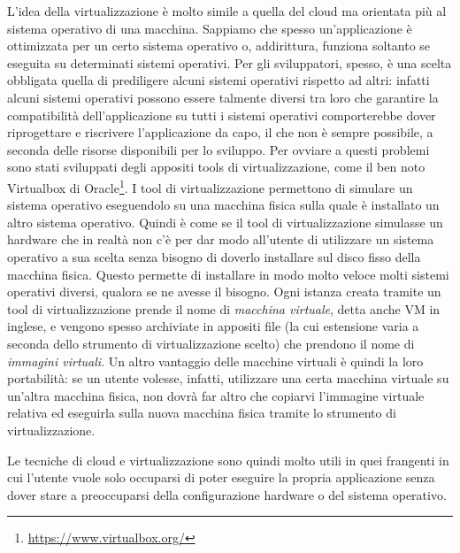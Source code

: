     L'idea della virtualizzazione è molto simile a quella del cloud ma orientata più al sistema operativo di una macchina. Sappiamo che spesso un'applicazione è ottimizzata per un certo sistema operativo o, addirittura, funziona soltanto se eseguita su determinati sistemi operativi. Per gli sviluppatori, spesso, è una scelta obbligata quella di prediligere alcuni sistemi operativi rispetto ad altri: infatti alcuni sistemi operativi possono essere talmente diversi tra loro che garantire la compatibilità dell'applicazione su tutti i sistemi operativi comporterebbe dover riprogettare e riscrivere l'applicazione da capo, il che non è sempre possibile, a seconda delle risorse disponibili per lo sviluppo. Per ovviare a questi problemi sono stati sviluppati degli appositi tools di virtualizzazione, come il ben noto Virtualbox di Oracle\footnote{\url{https://www.virtualbox.org/}}. I tool di virtualizzazione permettono di simulare un sistema operativo eseguendolo su una macchina fisica sulla quale è installato un altro sistema operativo. Quindi è come se il tool di virtualizzazione simulasse un hardware che in realtà non c'è per dar modo all'utente di utilizzare un sistema operativo a sua scelta senza bisogno di doverlo installare sul disco fisso della macchina fisica. Questo permette di installare in modo molto veloce molti sistemi operativi diversi, qualora se ne avesse il bisogno. Ogni istanza creata tramite un tool di virtualizzazione prende il nome di \textit{macchina virtuale}, detta anche \ac{VM} in inglese, e vengono spesso archiviate in appositi file (la cui estensione varia a seconda dello strumento di virtualizzazione scelto) che prendono il nome di \textit{immagini virtuali}. Un altro vantaggio delle macchine virtuali è quindi la loro portabilità: se un utente volesse, infatti, utilizzare una certa macchina virtuale su un'altra macchina fisica, non dovrà far altro che copiarvi l'immagine virtuale relativa ed eseguirla sulla nuova macchina fisica tramite lo strumento di virtualizzazione.
    
    Le tecniche di cloud e virtualizzazione sono quindi molto utili in quei frangenti in cui l'utente vuole solo occuparsi di poter eseguire la propria applicazione senza dover stare a preoccuparsi della configurazione hardware o del sistema operativo.
    

